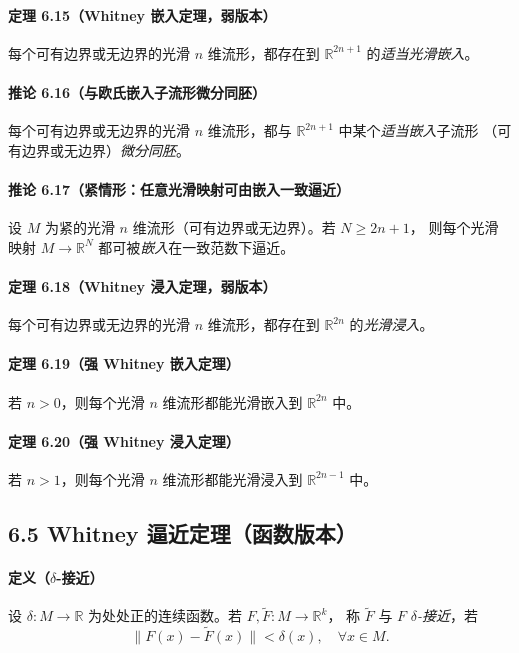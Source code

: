 \documentclass[11pt,a4paper]{article}
\begin{document}
\paragraph{定理 6.15（Whitney 嵌入定理，弱版本）}
每个可有边界或无边界的光滑 $n$ 维流形，都存在到 $\mathbb R^{2n+1}$ 的\emph{适当光滑嵌入}。

\paragraph{推论 6.16（与欧氏嵌入子流形微分同胚）}
每个可有边界或无边界的光滑 $n$ 维流形，都与 $\mathbb R^{2n+1}$ 中某个\emph{适当嵌入}子流形
（可有边界或无边界）\emph{微分同胚}。

\paragraph{推论 6.17（紧情形：任意光滑映射可由嵌入一致逼近）}
设 $M$ 为紧的光滑 $n$ 维流形（可有边界或无边界）。若 $N\ge 2n+1$，
则每个光滑映射 $M\to\mathbb R^N$ 都可被\emph{嵌入}在一致范数下逼近。

\paragraph{定理 6.18（Whitney 浸入定理，弱版本）}
每个可有边界或无边界的光滑 $n$ 维流形，都存在到 $\mathbb R^{2n}$ 的\emph{光滑浸入}。

\paragraph{定理 6.19（强 Whitney 嵌入定理）}
若 $n>0$，则每个光滑 $n$ 维流形都能光滑嵌入到 $\mathbb R^{2n}$ 中。

\paragraph{定理 6.20（强 Whitney 浸入定理）}
若 $n>1$，则每个光滑 $n$ 维流形都能光滑浸入到 $\mathbb R^{2n-1}$ 中。

\subsection*{6.5 Whitney 逼近定理（函数版本）}

\paragraph{定义（$\delta$-接近）}
设 $\delta:M\to\mathbb R$ 为处处正的连续函数。若 $F,\widetilde F:M\to\mathbb R^k$，
称 $\widetilde F$ 与 $F$ \emph{$\delta$-接近}，若
\[
\|F(x)-\widetilde F(x)\|<\delta(x),\quad \forall x\in M.
\]
\end{document}
